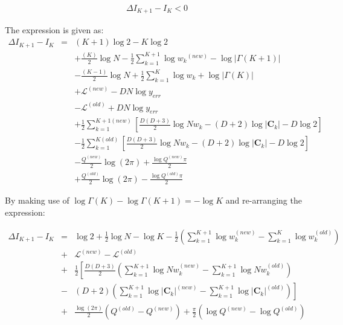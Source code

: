 \documentclass{elsarticle}
\newcommand{\vect}[1]{\boldsymbol{\mathbf{#1}}}
\def\veccov{\vect{C}}
\begin{document}
\begin{eqnarray}
  \Delta{}I_{K+1} - I_{K} < 0
\end{eqnarray}

The expression is given as:
\begin{eqnarray*}
\Delta{I_{K+1} - I_K} & = & (K + 1)\log{2} - K\log{2} \\ %
  &&+ \frac{(K)}{2}\log{N} - \frac{1}{2}\sum_{k=1}^{K+1}\log{w_k}^{(new)} - \log{|\Gamma(K+1)|} \\ %
  &&- \frac{(K - 1)}{2}\log{N} + \frac{1}{2}\sum_{k=1}^{K}\log{w_k} + \log{|\Gamma(K)|}\\ %
  &&+ \mathcal{L}^{(new)} - DN\log{y_{err}} \\ %
  &&- \mathcal{L}^{(old)} + DN\log{y_{err}} \\ %
  &&+ \frac{1}{2}\sum_{k=1}^{K+1(new)}\left[\frac{D(D+3)}{2}\log{{Nw_k}} - (D + 2)\log{|\veccov_k|} - D\log{2}\right] \\ %
  &&- \frac{1}{2}\sum_{k=1}^{K(old)}\left[\frac{D(D+3)}{2}\log{{Nw_k}} - (D + 2)\log{|\veccov_k|} - D\log{2}\right] \\ %
  &&- \frac{Q^{(new)}}{2}\log(2\pi) + \frac{\log{Q^{(new)}\pi}}{2} \\ %
  &&+ \frac{Q^{(old)}}{2}\log(2\pi) - \frac{\log{Q^{(old)}\pi}}{2} %
\end{eqnarray*}

\noindent{}By making use of $\log{\Gamma(K)} - \log{\Gamma(K + 1)} = -\log{K}$ and re-arranging the expression:

\begin{eqnarray}
\Delta{}I_{K+1} - I_K &=& \log{2} %
    + \frac{1}{2}\log{N} - \log{K} - \frac{1}{2}\left(\sum_{k=1}^{K+1}\log{w_k^{(new)}} - \sum_{k=1}^{K}\log{w_k^{(old)}}\right) \nonumber \\ %
& +& \mathcal{L}^{(new)} - \mathcal{L}^{(old)} \nonumber \\ %
& +& \frac{1}{2}\left[\frac{D(D+3)}{2}\left(\sum_{k=1}^{K+1}\log{Nw_k^{(new)} - \sum_{k=1}^{K+1}\log{Nw_k^{(old)}}} \right) \right.\nonumber\\
&-& \left.\left(D+2\right)\left(\sum_{k=1}^{K+1}\log{|\veccov_k|^{(new)}} - \sum_{k=1}^{K+1}\log{|\veccov_k|^{(old)}}\right)\right] \nonumber \\
& +& \frac{\log(2\pi)}{2}(Q^{(old)} - Q^{(new)}) + \frac{\pi}{2}\left(\log{Q^{(new)}} - \log{Q^{(old)}}\right)
\label{eq:13}
\end{eqnarray}
\end{document}
